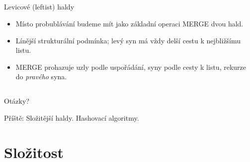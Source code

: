 \documentclass{beamer}
\begin{document}
\subsection{}
\begin{frame}{Levicové (leftist) haldy}
\begin{itemize}
\item Místo probublávání budeme mít jako základní operaci MERGE dvou hald.
\item Línější strukturální podmínka; levý syn má vždy delší cestu k nejbližšímu listu.
\item MERGE prohazuje uzly podle uspořádání, syny podle cesty k listu, rekurze do {\em pravého} syna.
\end{itemize}
\end{frame}

% 

\subsection{}
\begin{frame}{Otázky?}
\begin{center}
Příště: Složitější haldy. Hashovací algoritmy.
\end{center}
\end{frame}

\section{Složitost}
\end{document}
